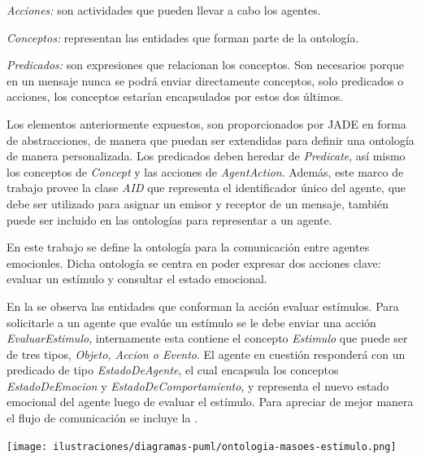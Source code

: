 \begin{vinetas}
    \item \textit{Acciones:} son actividades que pueden llevar a cabo los agentes.
    \item \textit{Conceptos:} representan las entidades que forman parte de la ontología.
    \item \textit{Predicados:} son expresiones que relacionan los conceptos. Son
    necesarios porque en un mensaje nunca se podrá enviar directamente conceptos, solo
    predicados o acciones, los conceptos estarían encapsulados por estos dos últimos.
\end{vinetas}

Los elementos anteriormente expuestos, son proporcionados por JADE en forma de abstracciones,
de manera que puedan ser extendidas para definir una ontología de manera personalizada.
Los predicados deben heredar de \textit{Predicate},
así mismo los conceptos de \textit{Concept} y las acciones de \textit{AgentAction}. Además,
este marco de trabajo provee la clase \textit{AID} que representa el identificador único del agente,
que debe ser utilizado para asignar un emisor y receptor de un mensaje, también puede ser incluido en las
ontologías para representar a un agente.

En este trabajo se define la ontología
 para la
comunicación entre agentes emocionles. Dicha ontología se centra en
poder expresar dos acciones clave: evaluar un estímulo
y consultar el estado emocional.

En la  se observa las entidades que conforman la
acción evaluar estímulos.
Para solicitarle a un agente que evalúe un estímulo se le debe enviar
 una acción \textit{EvaluarEstimulo},
internamente esta contiene el concepto \textit{Estimulo} que puede ser de tres tipos,
\textit{Objeto, Accion o Evento}.
El agente en cuestión responderá con un predicado de tipo \textit{EstadoDeAgente},
el cual encapsula los conceptos \textit{EstadoDeEmocion}
y \textit{EstadoDeComportamiento}, y representa el nuevo estado emocional del agente
luego de evaluar el estímulo.
Para apreciar de mejor manera el flujo de comunicación se incluye la .

\begin{ilustracion}[fuente=\yo, etiqueta=ontologia-masoes-estimulo, titulo={Ontología para MASOES, Acción Evaluar Estímulo}]
\texttt{[image: ilustraciones/diagramas-puml/ontologia-masoes-estimulo.png]}
\end{ilustracion}

